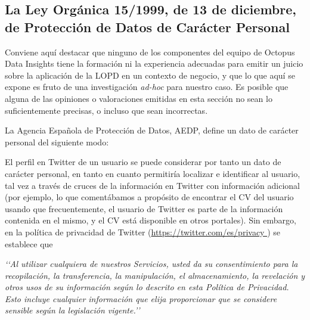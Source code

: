 \subsection{La Ley Orgánica 15/1999, de 13 de diciembre, de Protección de Datos
de Carácter Personal}
\label{subsection:LOPD}

Conviene aquí destacar que ninguno de los componentes del equipo de Octopus Data Insights 
tiene la formación ni la experiencia adecuadas para emitir un juicio sobre la aplicación
de la LOPD en un contexto de negocio, y que lo que aquí se expone es fruto de una 
investigación {\em ad-hoc}
para nuestro caso. Es posible que alguna de las opiniones o valoraciones emitidas en esta
sección no sean lo suficientemente precisas, o incluso que sean  incorrectas.

La Agencia Española de Protección de Datos, AEDP, define un dato de carácter personal del siguiente modo:


El perfil en Twitter de un usuario se puede considerar por tanto un dato de carácter personal, en tanto en cuanto
permitiría localizar e identificar al usuario, tal vez a través de cruces de la información en Twitter con
información adicional (por ejemplo, lo que comentábamos a propósito de encontrar el CV del usuario usando que
frecuentemente, el usuario de Twitter es parte de la información contenida en el mismo, y el CV está disponible en otros 
portales). Sin embargo, en la política de privacidad de Twitter (\url{https://twitter.com/es/privacy })
se establece que

\leftskip=1cm
\rightskip=1cm
{\em \lq\lq Al utilizar cualquiera de nuestros Servicios, usted da su consentimiento para la recopilación, 
 la transferencia, la manipulación, el almacenamiento, la revelación y otros usos de su información 
 según lo descrito en esta Política de Privacidad. Esto incluye cualquier información que elija proporcionar que 
 se considere sensible según la legislación vigente.\rq\rq}

\leftskip=0pt\rightskip=0pt




